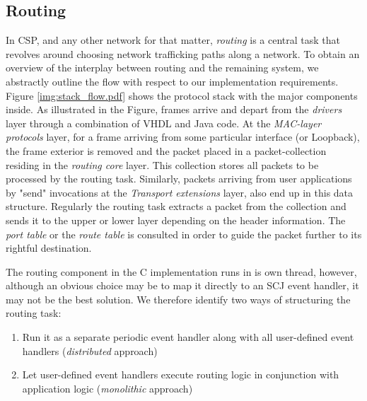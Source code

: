 \subsection{Routing}
In CSP, and any other network for that matter, \textit{routing} is a central task that revolves around choosing network trafficking paths along a network. To obtain an overview of the interplay between routing and the remaining system, we abstractly outline the flow with respect to our implementation requirements. Figure \ref{img:stack_flow.pdf} shows the protocol stack with the major components inside. As illustrated in the Figure, frames arrive and depart from the \textit{drivers} layer through a combination of VHDL and Java code. At the \textit{MAC-layer protocols} layer, for a frame arriving from some particular interface (\iic or Loopback), the frame exterior is removed and the packet placed in a packet-collection residing in the \textit{routing core} layer. This collection stores all packets to be processed by the routing task. Similarly, packets arriving from user applications by "send" invocations at the \textit{Transport extensions} layer, also end up in this data structure. Regularly the routing task extracts a packet from the collection and sends it to the upper or lower layer depending on the header information. The \textit{port table} or the \textit{route table} is consulted in order to guide the packet further to its rightful destination.


The routing component in the C implementation runs in is own thread, however, although an obvious choice may be to map it directly to an SCJ event handler, it may not be the best solution. We therefore identify two ways of structuring the routing task:

\begin{enumerate}
	\item Run it as a separate periodic event handler along with all user-defined event handlers (\textit{distributed} approach)
	\item Let user-defined event handlers execute routing logic in conjunction with application logic (\textit{monolithic} approach)
\end{enumerate}

